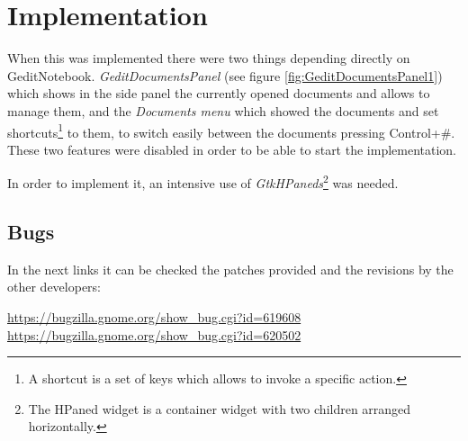 \section{Implementation}

When this was implemented there were two things depending directly on GeditNotebook. \emph{GeditDocumentsPanel} (see figure \ref{fig:GeditDocumentsPanel1}) which shows in the side panel the currently opened documents and allows to manage them, and the \emph{Documents menu} which showed the documents and set shortcuts\footnote{A shortcut is a set of keys which allows to invoke a specific action.} to them, to switch easily between the documents pressing Control+\#. These two features were disabled in order to be able to start the implementation.


In order to implement it, an intensive use of \emph{GtkHPaneds}\footnote{The HPaned widget is a container widget with two children arranged horizontally.} was needed.


\subsection{Bugs}

In the next links it can be checked the patches provided and the revisions by the other developers:

\noindent\url{https://bugzilla.gnome.org/show_bug.cgi?id=619608} \\
\noindent\url{https://bugzilla.gnome.org/show_bug.cgi?id=620502}
